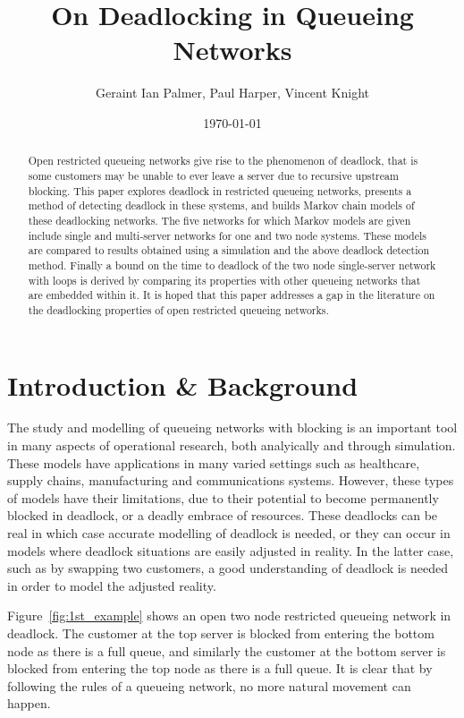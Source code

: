 \documentclass{article}
\title{On Deadlocking in Queueing Networks}
\author{Geraint Ian Palmer, Paul Harper, Vincent Knight}
\date{\today}
\numberwithin{equation}{section}
\begin{document}
\onehalfspacing

\maketitle

\begin{abstract}
Open restricted queueing networks give rise to the phenomenon of deadlock, that is some customers may be unable to ever leave a server due to recursive upstream blocking.
This paper explores deadlock in restricted queueing networks, presents a method of detecting deadlock in these systems, and builds Markov chain models of these deadlocking networks.
The five networks for which Markov models are given include single and multi-server networks for one and two node systems.
These models are compared to results obtained using a simulation and the above deadlock detection method.
Finally a bound on the time to deadlock of the two node single-server network with loops is derived by comparing its properties with other queueing networks that are embedded within it.
It is hoped that this paper addresses a gap in the literature on the deadlocking properties of open restricted queueing networks.

\end{abstract}

\section{Introduction \& Background}

The study and modelling of queueing networks with blocking is an important tool in many aspects of operational research, both analyically and through simulation.
These models have applications in many varied settings such as healthcare, supply chains, manufacturing and communications systems.
However, these types of models have their limitations, due to their potential to become permanently blocked in deadlock, or a deadly embrace of resources.
These deadlocks can be real in which case accurate modelling of deadlock is needed, or they can occur in models where deadlock situations are easily adjusted in reality. In the latter case, such as by swapping two customers, a good understanding of deadlock is needed in order to model the adjusted reality.

Figure~\ref{fig:1st_example} shows an open two node restricted queueing network in deadlock.
The customer at the top server is blocked from entering the bottom node as there is a full queue, and similarly the customer at the bottom server is blocked from entering the top node as there is a full queue.
It is clear that by following the rules of a queueing network, no more natural movement can happen.
\end{document}
